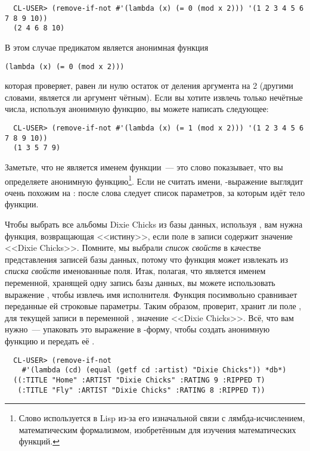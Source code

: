 \begin{verbatim}
  CL-USER> (remove-if-not #'(lambda (x) (= 0 (mod x 2))) '(1 2 3 4 5 6 7 8 9 10))
  (2 4 6 8 10)
\end{verbatim}

В этом случае предикатом является анонимная функция

\begin{lstlisting}
(lambda (x) (= 0 (mod x 2)))
\end{lstlisting}

которая проверяет, равен ли нулю остаток от деления аргумента на 2 (другими словами,
является ли аргумент чётным). Если вы хотите извлечь только нечётные числа, используя
анонимную функцию, вы можете написать следующее:

\begin{verbatim}
  CL-USER> (remove-if-not #'(lambda (x) (= 1 (mod x 2))) '(1 2 3 4 5 6 7 8 9 10))
  (1 3 5 7 9)
\end{verbatim}

Заметьте, что  не является именем функции~--- это слово показывает, что вы
определяете анонимную функцию\footnote{Слово  используется в Lisp из-за его
  изначальной связи с лямбда-исчислением, математическим формализмом, изобретённым для
  изучения математических функций.}. Если не считать имени, -выражение
выглядит очень похожим на : после слова  следует список
параметров, за которым идёт тело функции.

Чтобы выбрать все альбомы Dixie Chicks из базы данных, используя , вам
нужна функция, возвращающая <<истину>>, если поле в записи  содержит значение
<<Dixie Chicks>>. Помните, мы выбрали \textit{список свойств} в качестве представления
записей базы данных, потому что функция  может извлекать из \textit{списка
  свойств} именованные поля. Итак, полагая, что  является именем переменной,
хранящей одну запись базы данных, вы можете использовать выражение , чтобы извлечь имя исполнителя. Функция  посимвольно сравнивает
переданные ей строковые параметры. Таким образом,  проверит, хранит ли поле , для текущей записи в переменной ,
значение <<Dixie Chicks>>. Всё, что вам нужно~--- упаковать это выражение в
-форму, чтобы создать анонимную функцию и передать её .

\begin{verbatim}
  CL-USER> (remove-if-not
    #'(lambda (cd) (equal (getf cd :artist) "Dixie Chicks")) *db*)
  ((:TITLE "Home" :ARTIST "Dixie Chicks" :RATING 9 :RIPPED T)
   (:TITLE "Fly" :ARTIST "Dixie Chicks" :RATING 8 :RIPPED T))
\end{verbatim}

